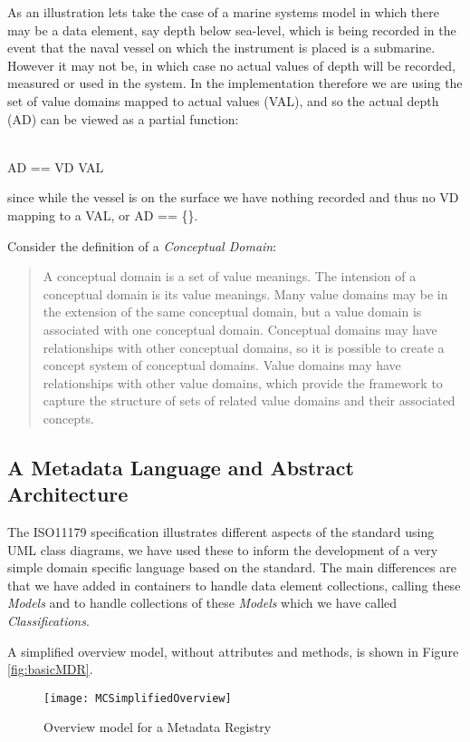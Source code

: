 As an illustration lets take the case of a marine systems model in which there may be a data element, say depth below sea-level, which is being recorded in the event that the naval vessel on which the instrument is placed is a submarine.  However it may not be, in which case no actual values of depth will be recorded, measured or used in the system. In the implementation therefore we are using the set of value domains mapped to actual values (VAL), and so the actual depth (AD) can be viewed as a partial function:
\vskip 4mm 
\begin{zed}
	[VAL]\\
	AD == VD \pfun VAL
\end{zed}
\vskip 4mm 
since while the vessel is on the surface we have nothing recorded and thus no VD mapping to a VAL, or AD == \{\}.  

Consider the definition of a \emph{Conceptual Domain}:
\begin{quote}
	A conceptual domain is a set of value meanings. The intension of a conceptual domain is its value meanings. Many value domains may be in the extension of the same conceptual domain, but a value domain is associated with one conceptual domain. Conceptual domains may have relationships with other conceptual domains, so it is possible to create a concept system of conceptual domains. Value domains may have relationships with other value domains, which provide the framework to capture the structure of sets of related value domains and their associated concepts.
	
\end{quote}


\subsection{A Metadata Language and Abstract Architecture }

The ISO11179 specification illustrates different aspects of the standard using UML class diagrams, we have used these to inform the development of a very simple domain specific language based on the standard. The main differences are that we have added in containers to handle data element collections, calling these \emph{Models} and to handle collections of these \emph{Models} which we have called \emph{Classifications}.

A simplified overview model, without attributes and methods, is shown in Figure \ref{fig:basicMDR}.

\begin{figure}[here]
	\texttt{[image: MCSimplifiedOverview]}
	\caption{Overview model for a Metadata Registry} 
	\label{fig:mcSimplifiedOverview}
\end{figure}



 




